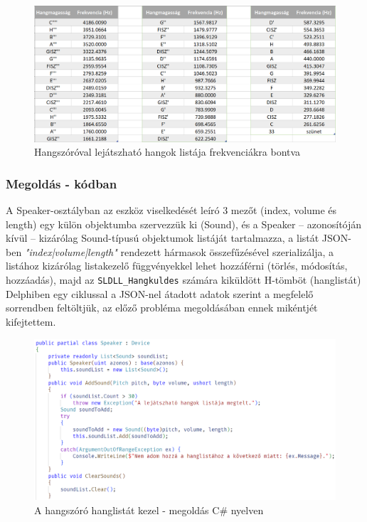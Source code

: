 \documentclass[tocnopagenum]{thesis-ekf}
\theoremstyle{definition}
\theoremstyle{remark}
\begin{document}
	\begin{figure}[h!]
	\centering
	\includegraphics[scale=0.7]{frequencies}
	\caption{Hangszóróval lejátszható hangok listája frekvenciákra bontva}
	\label{fig:frequencies}
	\end{figure}
	\subsubsection{Megoldás - kódban}
	A Speaker-osztályban az eszköz viselkedését leíró 3 mezőt (index, volume és length) egy külön objektumba szervezzük ki (Sound), és a Speaker -- azonosítóján kívül -- kizárólag Sound-típusú objektumok listáját tartalmazza, a listát JSON-ben \textit{"index|volume|length"} rendezett hármasok összefűzésével szerializálja, a listához kizárólag listakezelő függvényekkel lehet hozzáférni (törlés, módosítás, hozzáadás), majd az \verb*|SLDLL_Hangkuldes| számára kiküldött H-tömböt (hanglistát) Delphiben egy ciklussal a JSON-nel átadott adatok szerint a megfelelő sorrendben feltöltjük, az előző probléma megoldásában ennek mikéntjét kifejtettem.
	\begin{figure}[h!]
		\centering
		\includegraphics[scale=0.53]{speaker_csharp}
		\caption{A hangszóró hanglistát kezel - megoldás C\# nyelven}
		\label{speaker_csharp}
	\end{figure}
\end{document}

